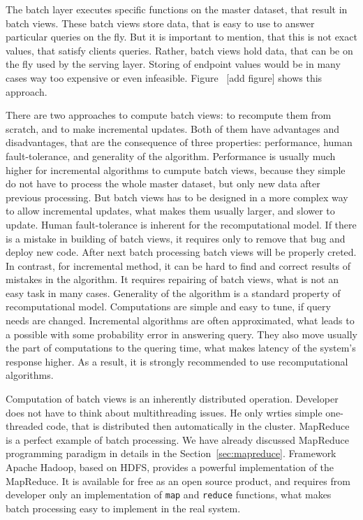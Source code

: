 The batch layer executes specific functions on the master dataset, that result in batch views.
These batch views store data, that is easy to use to answer particular queries on the fly.
But it is important to mention, that this is not exact values, that satisfy clients queries.
Rather, batch views hold data, that can be on the fly used by the serving layer.
Storing of endpoint values would be in many cases way too expensive or even infeasible.
Figure~ [add figure] shows this approach.

There are two approaches to compute batch views: to recompute them from scratch, and to make incremental updates.
Both of them have advantages and disadvantages, that are the consequence of three properties: performance, human fault-tolerance, and generality of the algorithm.
Performance is usually much higher for incremental algorithms to cumpute batch views, because they simple do not have to process the whole master dataset, but only new data after previous processing.
But batch views has to be designed in a more complex way to allow incremental updates, what makes them usually larger, and slower to update.
Human fault-tolerance is inherent for the recomputational model.
If there is a mistake in building of batch views, it requires only to remove that bug and deploy new code.
After next batch processing batch views will be properly creted.
In contrast, for incremental method, it can be hard to find and correct results of mistakes in the algorithm.
It requires repairing of batch views, what is not an easy task in many cases.
Generality of the algorithm is a standard property of recomputational model.
Computations are simple and easy to tune, if query needs are changed.
Incremental algorithms are often approximated, what leads to a possible with some probability error in answering query.
They also move usually the part of computations to the quering time, what makes latency of the system's response higher.
As a result, it is strongly recommended to use recomputational algorithms.

Computation of batch views is an inherently distributed operation.
Developer does not have to think about multithreading issues.
He only wrties simple one-threaded code, that is distributed then automatically in the cluster.
MapReduce is a perfect example of batch processing.
We have already discussed MapReduce programming paradigm in details in the Section~\ref{sec:mapreduce}.
Framework Apache Hadoop, based on HDFS, provides a powerful implementation of the MapReduce.
It is available for free as an open source product, and requires from developer only an implementation of \lstinline{map} and \lstinline{reduce} functions, what makes batch processing easy to implement in the real system.